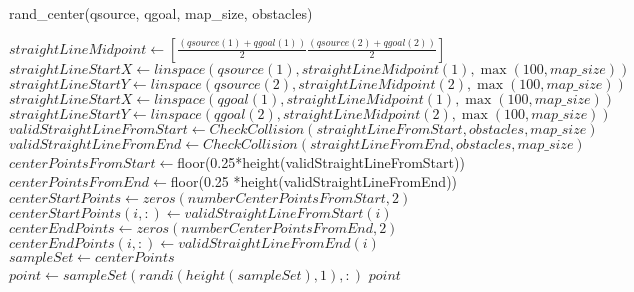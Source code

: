 \documentclass{article}
\begin{document}
\begin{algorithm}
\caption{rand\_center(qsource, qgoal, map\_size, obstacles)}
\begin{algorithmic}[1]
    \State $straightLineMidpoint \gets [\frac{(qsource(1) + qgoal(1))}{2} \frac{(qsource(2) + qgoal(2))}{2}]$
    \State $straightLineStartX \gets {linspace}(qsource(1), straightLineMidpoint(1), \max(100, map\_size))$
    \State $straightLineStartY \gets {linspace}(qsource(2), straightLineMidpoint(2), \max(100, map\_size))$
    \State $straightLineStartX \gets {linspace}(qgoal(1), straightLineMidpoint(1), \max(100, map\_size))$
    \State $straightLineStartY \gets {linspace}(qgoal(2), straightLineMidpoint(2), \max(100, map\_size))$
    \State $validStraightLineFromStart \gets {CheckCollision}(straightLineFromStart, obstacles, map\_size)$
    \State $validStraightLineFromEnd \gets {CheckCollision}(straightLineFromEnd, obstacles, map\_size)$
    \State $centerPointsFromStart \gets ${floor(0.25*height(validStraightLineFromStart))}
    \State $centerPointsFromEnd \gets ${floor(0.25 *height(validStraightLineFromEnd))}
    \State $centerStartPoints \gets {zeros}(numberCenterPointsFromStart, 2)$
        \State $centerStartPoints(i, :) \gets validStraightLineFromStart(i)$
    \EndFor
    \State $centerEndPoints \gets {zeros}(numberCenterPointsFromEnd, 2)$
        \State $centerEndPoints(i, :) \gets validStraightLineFromEnd(i)$
    \EndFor
    \State $sampleSet \gets centerPoints$
    \State $point \gets sampleSet({randi}({height}(sampleSet), 1), :)$
    \State \Return $point$
\EndFunction
\end{algorithmic}
\end{algorithm}
\end{document}
